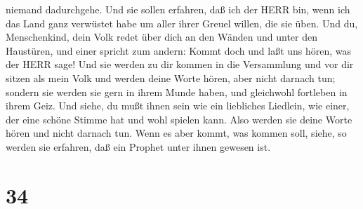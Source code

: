 niemand dadurchgehe.  Und sie sollen erfahren, daß ich der
HERR bin, wenn ich das Land ganz verwüstet habe um aller ihrer Greuel
willen, die sie üben.  Und du, Menschenkind, dein Volk
redet über dich an den Wänden und unter den Haustüren, und einer spricht
zum andern: Kommt doch und laßt uns hören, was der HERR sage!
 Und sie werden zu dir kommen in die Versammlung und vor
dir sitzen als mein Volk und werden deine Worte hören, aber nicht
darnach tun; sondern sie werden sie gern in ihrem Munde haben, und
gleichwohl fortleben in ihrem Geiz.  Und siehe, du mußt
ihnen sein wie ein liebliches Liedlein, wie einer, der eine schöne
Stimme hat und wohl spielen kann. Also werden sie deine Worte hören und
nicht darnach tun.  Wenn es aber kommt, was kommen soll,
siehe, so werden sie erfahren, daß ein Prophet unter ihnen gewesen ist.

\hypertarget{section-33}{%
\section{34}\label{section-33}}

